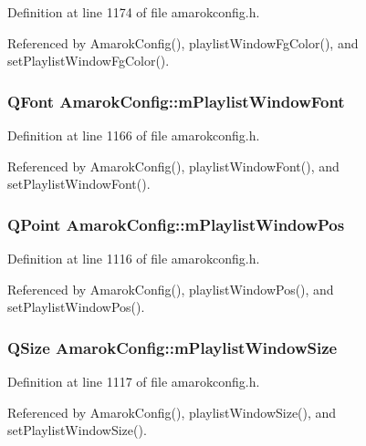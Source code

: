 Definition at line 1174 of file amarokconfig.h.

Referenced by Amarok\-Config(), playlist\-Window\-Fg\-Color(), and set\-Playlist\-Window\-Fg\-Color().
\subsubsection{\setlength{\rightskip}{0pt plus 5cm}QFont {\bf Amarok\-Config::m\-Playlist\-Window\-Font}\hspace{0.3cm}{\tt  [protected]}}\label{classAmarokConfig_AmarokConfigp46}




Definition at line 1166 of file amarokconfig.h.

Referenced by Amarok\-Config(), playlist\-Window\-Font(), and set\-Playlist\-Window\-Font().
\subsubsection{\setlength{\rightskip}{0pt plus 5cm}QPoint {\bf Amarok\-Config::m\-Playlist\-Window\-Pos}\hspace{0.3cm}{\tt  [protected]}}\label{classAmarokConfig_AmarokConfigp2}




Definition at line 1116 of file amarokconfig.h.

Referenced by Amarok\-Config(), playlist\-Window\-Pos(), and set\-Playlist\-Window\-Pos().
\subsubsection{\setlength{\rightskip}{0pt plus 5cm}QSize {\bf Amarok\-Config::m\-Playlist\-Window\-Size}\hspace{0.3cm}{\tt  [protected]}}\label{classAmarokConfig_AmarokConfigp3}




Definition at line 1117 of file amarokconfig.h.

Referenced by Amarok\-Config(), playlist\-Window\-Size(), and set\-Playlist\-Window\-Size().
